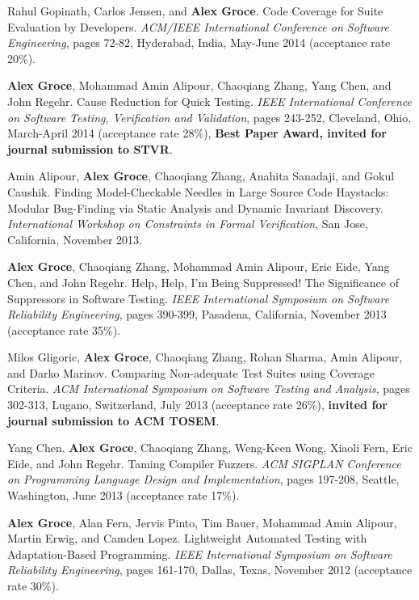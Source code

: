 \documentclass[ComputerScience]{vita}
\begin{document}
\begin{vita}
\begin{Refereed Conference and Workshop Publications}
\item
Rahul Gopinath, Carlos Jensen, and {\bf Alex Groce}.
\newblock Code Coverage for Suite Evaluation by Developers.
\newblock \emph{ACM/IEEE International Conference on Software Engineering}, pages 72-82, Hyderabad, India, May-June 2014 (acceptance rate 20\%). 

\item
{\bf Alex Groce}, Mohammad Amin Alipour, Chaoqiang Zhang, Yang Chen, and John Regehr.
\newblock Cause Reduction for Quick Testing.
\newblock \emph {IEEE International Conference on Software Testing, Verification and Validation}, pages 243-252, Cleveland, Ohio, March-April 2014 (acceptance rate 28\%), {\bf Best Paper Award, invited for journal submission to STVR}.

\item
Amin Alipour, {\bf Alex Groce}, Chaoqiang Zhang, Anahita Sanadaji, and Gokul Caushik.
\newblock Finding Model-Checkable Needles in Large Source Code Haystacks: Modular Bug-Finding via Static Analysis and Dynamic Invariant Discovery.
\newblock \emph{International Workshop on Constraints in Formal Verification}, San Jose, California, November 2013.

\item {\bf Alex Groce}, Chaoqiang Zhang, Mohammad Amin Alipour, Eric Eide, Yang Chen, and John Regehr.
\newblock Help, Help, I'm Being Suppressed! The Significance of Suppressors in Software Testing.
\newblock \emph{IEEE International Symposium on Software Reliability Engineering}, pages 390-399, Pasadena, California, November 2013 (acceptance rate 35\%).

\item Milos Gligoric, {\bf Alex Groce}, Chaoqiang Zhang, Rohan Sharma, Amin Alipour, and Darko Marinov.
\newblock Comparing Non-adequate Test Suites using Coverage Criteria.
\newblock \emph{ACM International Symposium on Software Testing and Analysis}, pages 302-313, Lugano, Switzerland, July 2013 (acceptance rate 26\%), {\bf invited for journal submission to ACM TOSEM}.

\item Yang Chen, {\bf Alex Groce}, Chaoqiang Zhang, Weng-Keen Wong, Xiaoli Fern, Eric Eide, and John Regehr.
\newblock Taming Compiler Fuzzers.
\newblock \emph{ACM SIGPLAN Conference on Programming Language Design and Implementation}, pages 197-208, Seattle, Washington, June 2013 (acceptance rate 17\%).

\item {\bf Alex Groce}, Alan Fern, Jervis Pinto, Tim Bauer, Mohammad Amin Alipour, Martin Erwig, and Camden Lopez.
\newblock Lightweight Automated Testing with Adaptation-Based Programming.
\newblock \emph{IEEE International Symposium on Software Reliability Engineering}, pages 161-170, Dallas, Texas, November 2012 (acceptance rate 30\%).


\end{Refereed Conference and Workshop Publications}
\end{vita}
\end{document}
